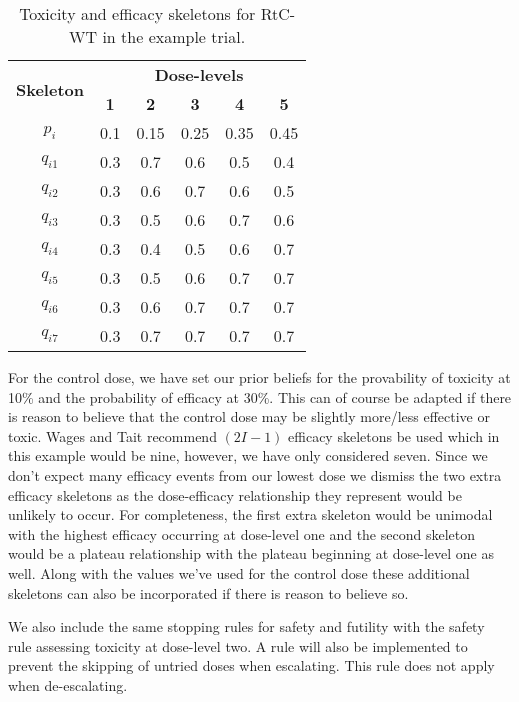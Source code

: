 \begin{table}[!h]
	\centering
	\caption{Toxicity and efficacy skeletons for RtC-WT in the example trial.}
	\label{tab_wt:tox-eff-skeleton}
	\begin{tabular}{c|ccccc}
		\hline
		\multicolumn{1}{c|}{\multirow{2}{*}{\textbf{Skeleton}}} & \multicolumn{5}{c}{\textbf{Dose-levels}}                       \\
		\multicolumn{1}{c|}{}                                   & \textbf{1} & \textbf{2} & \textbf{3} & \textbf{4} & \textbf{5} \\ \hline
		$p_i$    & 0.1 & 0.15 & 0.25 & 0.35 & 0.45 \\
		$q_{i1}$ & 0.3 & 0.7 & 0.6 & 0.5 & 0.4 \\
		$q_{i2}$ & 0.3 & 0.6 & 0.7 & 0.6 & 0.5 \\
		$q_{i3}$ & 0.3 & 0.5 & 0.6 & 0.7 & 0.6 \\
		$q_{i4}$ & 0.3 & 0.4 & 0.5 & 0.6 & 0.7 \\
		$q_{i5}$ & 0.3 & 0.5 & 0.6 & 0.7 & 0.7 \\
		$q_{i6}$ & 0.3 & 0.6 & 0.7 & 0.7 & 0.7 \\
		$q_{i7}$ & 0.3 & 0.7 & 0.7 & 0.7 & 0.7 \\ \hline
	\end{tabular}
\end{table}

For the control dose, we have set our prior beliefs for the provability of toxicity at 10\% and the probability of efficacy at 30\%. This can of course be adapted if there is reason to believe that the control dose may be slightly more/less effective or toxic. Wages and Tait recommend $(2I-1)$ efficacy skeletons be used which in this example would be nine, however, we have only considered seven. Since we don't expect many efficacy events from our lowest dose we dismiss the two extra efficacy skeletons as the dose-efficacy relationship they represent would be unlikely to occur. For completeness, the first extra skeleton would be unimodal with the highest efficacy occurring at dose-level one and the second skeleton would be a plateau relationship with the plateau beginning at dose-level one as well. Along with the values we've used for the control dose these additional skeletons can also be incorporated if there is reason to believe so. 

We also include the same stopping rules for safety and futility with the safety rule assessing toxicity at dose-level two. A rule will also be implemented to prevent the skipping of untried doses when escalating. This rule does not apply when de-escalating. 

